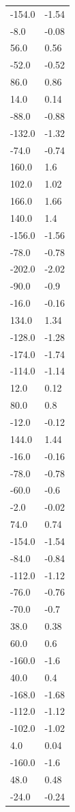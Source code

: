 \begin{longtable}{ll}
-154.0 & -1.54 \\
-8.0 & -0.08 \\
56.0 & 0.56 \\
-52.0 & -0.52 \\
86.0 & 0.86 \\
14.0 & 0.14 \\
-88.0 & -0.88 \\
-132.0 & -1.32 \\
-74.0 & -0.74 \\
160.0 & 1.6 \\
102.0 & 1.02 \\
166.0 & 1.66 \\
140.0 & 1.4 \\
-156.0 & -1.56 \\
-78.0 & -0.78 \\
-202.0 & -2.02 \\
-90.0 & -0.9 \\
-16.0 & -0.16 \\
134.0 & 1.34 \\
-128.0 & -1.28 \\
-174.0 & -1.74 \\
-114.0 & -1.14 \\
12.0 & 0.12 \\
80.0 & 0.8 \\
-12.0 & -0.12 \\
144.0 & 1.44 \\
-16.0 & -0.16 \\
-78.0 & -0.78 \\
-60.0 & -0.6 \\
-2.0 & -0.02 \\
74.0 & 0.74 \\
-154.0 & -1.54 \\
-84.0 & -0.84 \\
-112.0 & -1.12 \\
-76.0 & -0.76 \\
-70.0 & -0.7 \\
38.0 & 0.38 \\
60.0 & 0.6 \\
-160.0 & -1.6 \\
40.0 & 0.4 \\
-168.0 & -1.68 \\
-112.0 & -1.12 \\
-102.0 & -1.02 \\
4.0 & 0.04 \\
-160.0 & -1.6 \\
48.0 & 0.48 \\
-24.0 & -0.24 \\

\end{longtable}
